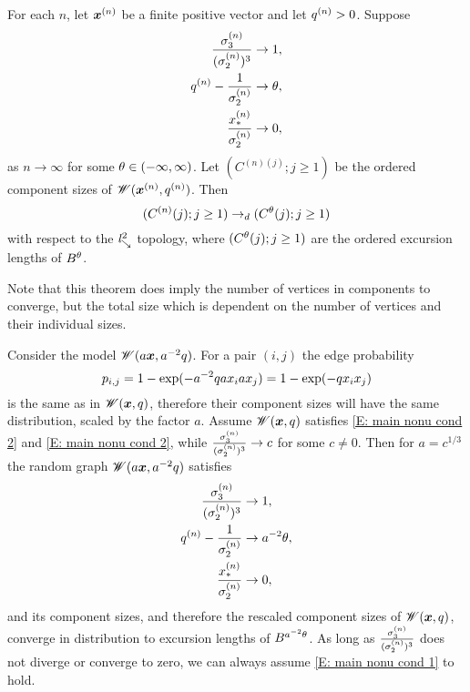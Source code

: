 \begin{theorem} \label{T: Main nonuniform}
	For each $n$, let $\boldsymbol{x}^{(n)}$ be a finite positive vector and let $q^{(n)} > 0$.
	Suppose
	\begin{align}
		\frac{\sigma^{(n)}_3}{(\sigma^{(n)}_2)^3} &\rightarrow 1, \label{E: main nonu cond 1} \\ 
		q^{(n)} - \frac{1}{\sigma^{(n)}_2} &\rightarrow \theta, \label{E: main nonu cond 2} \\ 
		\frac{x_*^{(n)}}{\sigma^{(n)}_2} &\rightarrow 0, \label{E: main nonu cond 3}
	\end{align}
	as $n \rightarrow \infty$ for some $\theta \in (-\infty, \infty)$.
	Let $(C^{(n)(j)}; j \geq 1)$ be the ordered component sizes of $\mathscr{W}(\boldsymbol{x}^{(n)}, q^{(n)})$.
	Then
	\begin{equation}
		(C^{(n)}(j); j \geq 1) \rightarrow_d (C^{\theta}(j); j \geq 1)
	\end{equation}
	with respect to the $\mathit{l}^2_{\searrow}$ topology, where $(C^{\theta}(j); j \geq 1)$ are the ordered excursion lengths of $B^{\theta}$.
\end{theorem}

Note that this theorem does imply the number of vertices in components to converge,
but the total size which is dependent on the number of vertices and their individual sizes.

Consider the model $\mathscr{W}(a\boldsymbol{x}, a^{-2}q)$.
For a pair $(i,j)$ the edge probability
\begin{equation}
	p_{i,j} = 1 - \exp(-a^{-2}q ax_iax_j) = 1 - \exp(-q x_ix_j)
\end{equation}
is the same as in $\mathscr{W}(\boldsymbol{x}, q)$,
therefore their component sizes will have the same distribution,
scaled by the factor $a$.
Assume $\mathscr{W}(\boldsymbol{x}, q)$ satisfies \eqref{E: main nonu cond 2} and \eqref{E: main nonu cond 2},
while $\frac{\sigma^{(n)}_3}{(\sigma^{(n)}_2)^3} \rightarrow c$ for some $c \neq 0$.
Then for $a = c^{1/3}$ the random graph $\mathscr{W}(a\boldsymbol{x}, a^{-2}q)$ satisfies
\begin{equation}
	\begin{aligned}
	\frac{\sigma^{(n)}_3}{(\sigma^{(n)}_2)^3} &\rightarrow 1, \\ 
	q^{(n)} - \frac{1}{\sigma^{(n)}_2} &\rightarrow a^{-2}\theta, \\
	\frac{x_*^{(n)}}{\sigma^{(n)}_2} &\rightarrow 0,
	\end{aligned}
\end{equation}
and its component sizes,
and therefore the rescaled component sizes of $\mathscr{W}(\boldsymbol{x}, q)$,
converge in distribution to excursion lengths of $B^{a^{-2}\theta}$.
As long as $\frac{\sigma^{(n)}_3}{(\sigma^{(n)}_2)^3}$ does not diverge or converge to zero,
we can always assume \eqref{E: main nonu cond 1} to hold.

